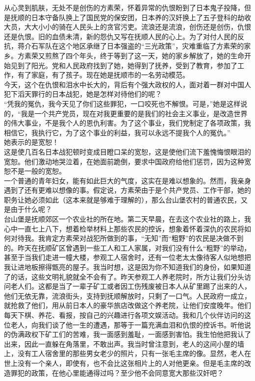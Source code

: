 从心灵到肌肤，无处不是创伤的方素荣，怀着异常的仇恨盼到了日本鬼子投降，但是抚顺的日本守备队换上了国民党的保安团，日本养的汉奸换上了五子登科的劫收大员，大大小小的骑在人民头上的贪官污吏。流浪还是流浪，创伤还是创伤，仇恨还是仇恨。旧的血债未清，新的怨仇又写在抚顺人民的心上。为了对付人民的反抗，蒋介石军队在这个地区承继了日本强盗的“三光政策”，灾难重临了方素荣的家乡。方素荣又煎熬了四个年头，终于等到了这一天，她的家乡解放了，她的生命开始见到了阳光。党和人民政府找到了她，她得到了抚养，受到了教育，参加了工作，有了家庭，有了孩子。现在她是抚顺市的一名劳动模范。\\

今天，这个在仇恨和泪水中长大的，背后有个强大政权的人，面对着一群对中国人犯下滔天罪行的日本战犯，她是怎样对待他们的呢？\\

“凭我的冤仇，我今天见了你们这些罪犯，一口咬死也不解恨。可是，”她是这样说的，“我是一个共产党员，现在对我更重要的是我们的社会主义事业，是改造世界的伟大事业，不是我个人的恩仇利害。为了这个事业，我们党制定了各项政策，我相信它，我执行它，为了这个事业的利益，我可以永远不提我个人的冤仇。”\\

她表示的是宽恕！\\

这是使几百名日本战犯顿时变成目瞪口呆的宽恕，这是使他们流下羞愧悔恨眼泪的宽恕。他们激动地哭泣着，在她面前跪倒，要求中国政府给他们惩罚，因为这种宽恕不是一般的宽恕。\\

一个普通的青年妇女，能有如此巨大的气度，这实在是难以想象的。然而，我亲身遇到了还有更难以想像的事。假定说，方素荣由于是个共产党员、工作干部，她的职务让她必须如此（这本来就是够难于理解的），那么台山堡农村的普通农民，又是由于什么呢？\\

台山堡是抚顺郊区一个农业社的所在地。第二天早晨，在去这个农业社的路上，我心中一直七上八下，想着检举材料上那些农民的控诉，想象着怀着深仇的农民将如何对待我。我肯定方素荣对战犯所做到的事，“无知”而“粗野”的农民是决做不到的。昨天在抚顺矿区曾遇到一些工人和工人家属，对我们没有什么“粗野”的举动，甚至于当我们走进一幢大楼，参观工人宿舍时，还有一位老太太像待客人似地想把我让进地板擦得甑亮的屋子。我当时想，这是因为你不知道我们的身份，如果知道了的话，这些文明礼貌就全不会有了。昨天参观工人养老院时，所方让我们分头访问老人们。这都是当了一辈子矿工或者因工伤残废被日本人从矿里踢了出来的人，他们无依无靠，流浪街头，支持到抚顺解放时，只剩了一口气。人民政府一成立，就抢救了他们，用从前日本人的豪华旅店改做这个养老院，让他们安度晚年。他们每天下棋、养花、看报，按自己的兴趣进行各项文娱活动。我和几个伙伴访问的这位老人，向我们谈了他一生的遭遇，那等于一篇充满血泪和仇恨的控诉书。听他说的伪满政权下矿工们的苦难，我一面感到羞耻，一面感到害怕。我生怕他把我认了出来，因此一直躲在角落里，不敢出声。我当时曾注意到，老人的这间小屋的墙上，没有工人宿舍里的那些男女老少的照片，只有一张毛主席的像。显然，老人在世上没有一个亲人，即使有，也不会比这张相片上的人对他更亲。但是毛主席的改造罪犯的政策，在他心里能通得过吗？至少他不会同意宽大那些汉奸吧？\\

